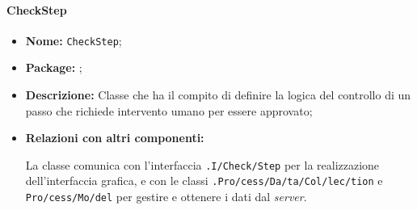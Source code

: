 \paragraph{CheckStep}
\begin{flushleft}
\begin{itemize}
\item \textbf{Nome:} \texttt{CheckStep};
\item \textbf{Package:} \texttt{\logicAdmin{}};
\item \textbf{Descrizione:} Classe che ha il compito di definire la logica del controllo di un passo che richiede intervento umano per essere approvato;
\item \textbf{Relazioni con altri componenti:}
\begin{sloppypar}
La classe comunica con l'interfaccia \texttt{\viewAdmin{}.I\fshyp{}Check\fshyp{}Step} per la realizzazione dell'interfaccia grafica, e con le classi \texttt{\collection{}.Pro\fshyp{}cess\fshyp{}Da\fshyp{}ta\fshyp{}Col\fshyp{}lec\fshyp{}tion} e \texttt{\model{}Pro\fshyp{}cess\fshyp{}Mo\fshyp{}del} per gestire e ottenere i dati dal \textit{server}.
\end{sloppypar}
\end{itemize}
\end{flushleft}